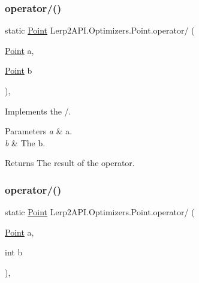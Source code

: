 \subsubsection{\texorpdfstring{operator/()}{operator/()}\hspace{0.1cm}{\footnotesize\ttfamily [1/2]}}
{\footnotesize\ttfamily static \hyperlink{struct_lerp2_a_p_i_1_1_optimizers_1_1_point}{Point} Lerp2\+A\+P\+I.\+Optimizers.\+Point.\+operator/ (\begin{DoxyParamCaption}\item[{\hyperlink{struct_lerp2_a_p_i_1_1_optimizers_1_1_point}{Point}}]{a,  }\item[{\hyperlink{struct_lerp2_a_p_i_1_1_optimizers_1_1_point}{Point}}]{b }\end{DoxyParamCaption})\hspace{0.3cm}{\ttfamily [inline]}, {\ttfamily [static]}}



Implements the /. 


\begin{DoxyParams}{Parameters}
{\em a} & a.\\
\hline
{\em b} & The b.\\
\hline
\end{DoxyParams}
\begin{DoxyReturn}{Returns}
The result of the operator.
\end{DoxyReturn}
\mbox{\label{struct_lerp2_a_p_i_1_1_optimizers_1_1_point_ad397681f2cd319fdbc4b004bd00a2ddd}} 
\subsubsection{\texorpdfstring{operator/()}{operator/()}\hspace{0.1cm}{\footnotesize\ttfamily [2/2]}}
{\footnotesize\ttfamily static \hyperlink{struct_lerp2_a_p_i_1_1_optimizers_1_1_point}{Point} Lerp2\+A\+P\+I.\+Optimizers.\+Point.\+operator/ (\begin{DoxyParamCaption}\item[{\hyperlink{struct_lerp2_a_p_i_1_1_optimizers_1_1_point}{Point}}]{a,  }\item[{int}]{b }\end{DoxyParamCaption})\hspace{0.3cm}{\ttfamily [inline]}, {\ttfamily [static]}}



